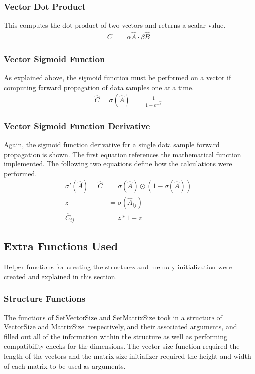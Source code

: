 \documentclass[11pt]{article}
\begin{document}
\subsubsection{Vector Dot Product}
This computes the dot product of two vectors and returns a scalar value.
\begin{align*}
	C & = \alpha \hat{A} \cdot \beta \hat{B} 
\end{align*}

\subsubsection{Vector Sigmoid Function}
As explained above, the sigmoid function must be performed on a vector if computing forward propagation of data samples one at a time.
\begin{align*}
	\hat{C} = \sigma(\hat{A}) & = \frac{1}{1 + e^{-\hat{A}}} 
\end{align*}

\subsubsection{Vector Sigmoid Function Derivative}
Again, the sigmoid function derivative for a single data sample forward propagation is shown. The first equation references the mathematical function implemented. The following two equations define how the calculations were performed.
\begin{align*}
	\sigma'(\hat{A}) = \hat{C} & = \sigma(\hat{A}) \odot (1 - \sigma(\hat{A})) \\
	z                          & = \sigma(\hat{A}_{ij})                        \\
	\hat{C}_{ij}               & = z * 1-z                                     
\end{align*}

\subsection{Extra Functions Used}
Helper functions for creating the structures and memory initialization were created and explained in this section.

\subsubsection{Structure Functions}
The functions of SetVectorSize and SetMatrixSize took in a structure of VectorSize and MatrixSize, respectively, and their associated arguments, and filled out all of the information within the structure as well as performing compatibility checks for the dimensions. The vector size function required the length of the vectors and the matrix size initializer required the height and width of each matrix to be used as arguments.
\end{document}
